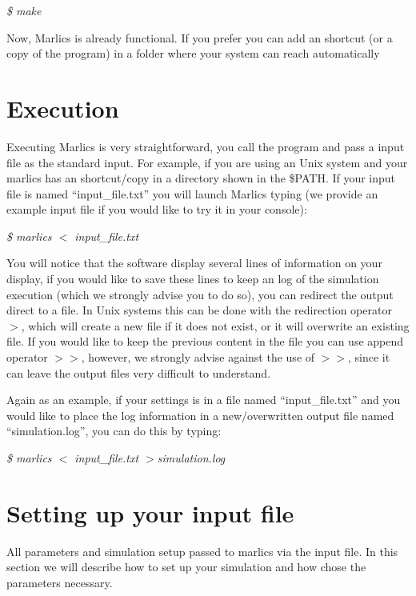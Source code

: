 \documentclass{article}
\newcommand{\consoleline}[2][0.5cm]
{\vspace{#1}
\textit{{#2}}
\vspace{#1}
}
\begin{document}
\consoleline{\$ make}

Now, Marlics is already functional. If you prefer you can add an shortcut (or a copy of the program) in a folder where your system can reach automatically
\section{Execution}

Executing Marlics is very straightforward, you call the program and pass a input file as the standard input. For example, if you are using an Unix system and your marlics has an shortcut/copy in a directory shown in the \$PATH. If your input file is named ``input\_file.txt'' you will launch Marlics typing (we provide an example input file if you would like to try it in your console):


\consoleline{\$ marlics $<$ input\_file.txt}


You will notice that the software display several lines of information on your display, if you would like to save these lines to keep an log of the simulation execution (which we strongly advise you to do so), you can redirect the output direct to a file. In Unix systems this can be done with the redirection operator $>$, which will create a new file if it does not exist, or it will overwrite an existing file. If you would like to keep the previous content in the file you can use append operator $>>$, however, we strongly advise against the use of $>>$, since it can leave the output files very difficult to understand.

Again as an example, if your settings is in a file named ``input\_file.txt'' and you would like to place the log information in a new$/$overwritten  output file named ``simulation.log'', you can do this by typing:

\consoleline{\$ marlics $<$ input\_file.txt $>$simulation.log}

\section{Setting up your input file}\label{sec:inputfile}

All parameters and simulation setup  passed to marlics via the input file. In this section we will describe how to set up your simulation and how chose the parameters necessary.
\end{document}
